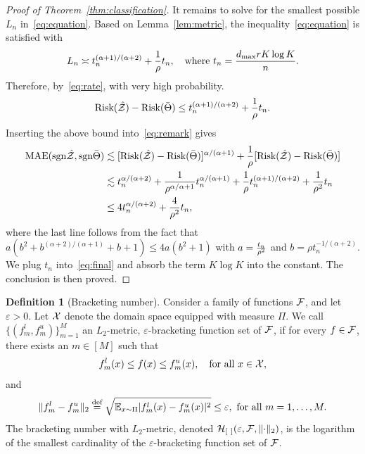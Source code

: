 \documentclass[11pt]{article}
\theoremstyle{plain}
\theoremstyle{definition}
\newtheorem{defn}{Definition}[section]
\def\sign{\textup{sgn}}
\def\risk{\textup{Risk}}
\begin{document}
\begin{proof}[Proof of Theorem~\ref{thm:classification}]
It remains to solve for the smallest possible $L_n$ in~\eqref{eq:equation}. Based on Lemma~\ref{lem:metric}, the inequality~\eqref{eq:equation} is satisfied with 
\begin{equation}\label{eq:tn}
L_n\asymp t_n^{(\alpha+1)/ (\alpha+2)} +{1\over \rho} t_n, \quad \text{where }t_n={d_{\max}rK\log K \over n}.
\end{equation}
Therefore, by~\eqref{eq:rate}, with very high probability. 
\[
\risk(\hat \tZ)-\risk(\bar \Theta )\leq t_n^{(\alpha+1)/(\alpha+2)} +{1\over \rho} t_n.
\]
Inserting the above bound into~\eqref{eq:remark} gives
\begin{align}\label{eq:final}
\textup{MAE}(\sign \hat \tZ, \sign \bar \Theta) &\lesssim [\risk(\hat \tZ)-\risk(\bar \Theta)]^{\alpha/(\alpha+1)}+{1\over \rho}[\risk(\hat \tZ)-\risk(\bar \Theta)]\notag \\
&\lesssim t_n^{\alpha/(\alpha+2)}+{1\over \rho^{\alpha/\alpha+1}}t_n^{\alpha/(\alpha+1)}+{1\over \rho}t_n^{(\alpha+1)/(\alpha+2)}+{1\over \rho^2}t_n\notag \\
&\leq 4t_n^{\alpha/(\alpha+2)}+{4\over \rho^2}t_n,
\end{align}
where the last line follows from the fact that $a(b^2+b^{(\alpha+2)/(\alpha+1)}+b+1) \leq 4 a (b^2+1)$ with $a={t_n \over \rho^2}$ and $b=\rho t_n^{-1/(\alpha+2)}$. We plug $t_n$ into~\eqref{eq:final} and absorb the term $K\log K$ into the constant. The conclusion is then proved. 
\end{proof}

\begin{defn}[Bracketing number]\label{pro:inftynorm}
Consider a family of functions $\mathcal{F}$, and let $\varepsilon>0$. Let $\mathcal{X} $ denote the domain space equipped with measure $\Pi$. We call $\{(f^l_m,f^u_m)\}_{m=1}^M$ an $L_2$-metric, $\varepsilon$-bracketing function set of $\mathcal{F}$, if for every $f\in \mathcal{F}$, there exists an $m\in[M]$ such that 
\[
f^l_m(x)\leq f(x)\leq f^u_m(x),\quad \text{for all }x\in\mathcal{X},
\]
and
\[
\lVert f^l_m-f^u_m\rVert_2\stackrel{\text{def}}{=}\sqrt{\mathbb{E}_{x\sim \Pi}|f^l_m(x)-f^u_m(x)|^2} \leq \varepsilon, \ \text{for all } m=1,\ldots,M. 
\]
The bracketing number with $L_2$-metric, denoted $\mathcal{H}_{[\ ]}(\varepsilon, \mathcal{F}, \lVert\cdot\rVert_2)$, is the logarithm of the smallest cardinality of the $\varepsilon$-bracketing function set of $\mathcal{F}$.  
\end{defn}
\end{document}
